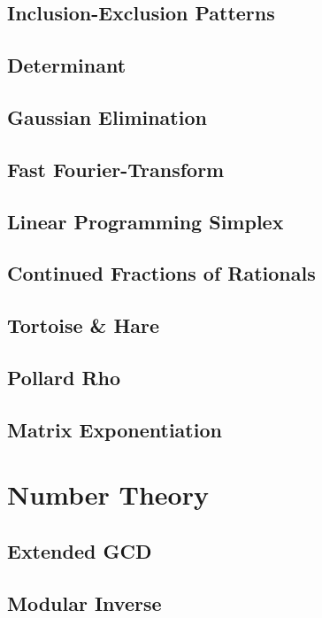 		\subsection{Inclusion-Exclusion Patterns}
			
		\subsection{Determinant}
			
		\subsection{Gaussian Elimination}
			
		\subsection{Fast Fourier-Transform}
			
		\subsection{Linear Programming Simplex}
			
		\subsection{Continued Fractions of Rationals}
			
		\subsection{Tortoise \& Hare}
			
		\subsection{Pollard Rho}
			
		\subsection{Matrix Exponentiation}
			
	\section{Number Theory}
		\subsection{Extended GCD}
			
		\subsection{Modular Inverse}
			
